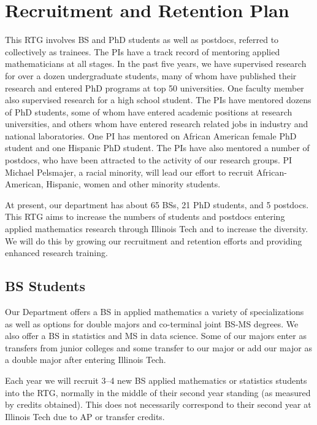 \documentclass[11pt]{NSFamsart}
\newcommand{\numUG}{65\xspace}
\newcommand{\numPhD}{21\xspace}
\newcommand{\numPostDoc}{5 \xspace}
\begin{document}
\section{Recruitment and Retention Plan} \label{sec:RandR}

This RTG involves BS and PhD students as well as postdocs, referred to collectively as trainees.  The PIs have a track record of mentoring  applied mathematicians at all stages.  In the past five years, we have supervised research for over a dozen undergraduate students, many of whom have published their research and entered PhD programs at top 50 universities. One faculty member also supervised research for a high school student.  The PIs have  mentored dozens of PhD students, some of whom have entered academic positions at research universities, and others whom have entered research related jobs in industry and national laboratories. One PI has mentored on African American female PhD student and one Hispanic PhD student. The PIs have also mentored a number of postdocs, who have been attracted to the activity of our research groups. PI Michael Pelsmajer, a racial minority, will lead our effort to 
recruit African-American, Hispanic, women and other minority students.

At present, our department has about \numUG BSs, \numPhD PhD students, and \numPostDoc postdocs.  This RTG aims to increase the numbers of students and postdocs entering applied mathematics research through Illinois Tech and to increase the diversity.  We will do this by growing our recruitment and retention efforts and providing enhanced research training.

\subsection*{BS Students}
Our Department  offers a BS in applied mathematics a variety of specializations as well as options for double majors and co-terminal joint BS-MS degrees. We also offer a BS in statistics and MS in data science.  Some of our majors enter as transfers from junior colleges and some transfer to our major or add our major as a double major after entering Illinois Tech.

 
Each year we will recruit 3--4 new BS applied mathematics or statistics students into the RTG, normally in the middle of their second year standing (as measured by credits obtained).  This does not necessarily correspond to their second year at Illinois Tech due to AP or transfer credits.
\end{document}
